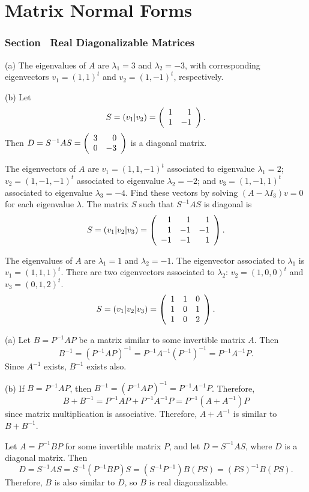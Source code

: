 \chapter{Matrix Normal Forms}

\subsection*{Section~\protect{\ref{S:RDM}} Real Diagonalizable Matrices}

(a) The eigenvalues of $A$ are $\lambda_1 = 3$ and $\lambda_2 = -3$,
with corresponding eigenvectors $v_1 = (1,1)^t$ and $v_2 = (1,-1)^t$,
respectively.

(b) Let
\[
S = (v_1|v_2) = \left(\begin{array}{rr} 1 & 1\\ 1 &-1\end{array}\right).
\]
Then $D = S^{-1}AS = \left(\begin{array}{rr} 3 & 0\\ 0 &-3\end{array}\right)$ is a diagonal matrix.

The eigenvectors of $A$ are $v_1 = (1,1,-1)^t$ associated to eigenvalue
$\lambda_1 = 2$; $v_2 = (1,-1,-1)^t$ associated to eigenvalue
$\lambda_2 = -2$; and $v_3 = (1,-1,1)^t$ associated to eigenvalue
$\lambda_3 = -4$.  Find these vectors by solving $(A - \lambda I_3)v = 0$
for each eigenvalue $\lambda$.  The matrix $S$ such that $S^{-1}AS$ is
diagonal is
\[
S = (v_1|v_2|v_3) = \left(\begin{array}{rrr} 1 & 1 & 1 \\ 1 & -1 & -1 \\ -1 & -1 & 1\end{array}\right).
\]

The eigenvalues of $A$ are $\lambda_1 = 1$ and $\lambda_2 = -1$.  The
eigenvector associated to $\lambda_1$ is $v_1 = (1,1,1)^t$.  There are
two eigenvectors associated to $\lambda_2$: $v_2 = (1,0,0)^t$ and
$v_3 = (0,1,2)^t$.
\[
S = (v_1|v_2|v_3) = \left(\begin{array}{rrr} 1 & 1 & 0 \\ 1 & 0 & 1 \\ 1 & 0 & 2\end{array}\right).
\]

(a) Let $B = P^{-1}AP$ be a matrix similar to some invertible matrix $A$.
Then 
\[
B^{-1} = (P^{-1}AP)^{-1} = P^{-1}A^{-1}(P^{-1})^{-1} = P^{-1}A^{-1}P.
\]
Since $A^{-1}$ exists, $B^{-1}$ exists also.

(b) If $B = P^{-1}AP$, then $B^{-1} = (P^{-1}AP)^{-1} = P^{-1}A^{-1}P$.
Therefore,
\[
B + B^{-1} = P^{-1}AP + P^{-1}A^{-1}P = P^{-1}(A + A^{-1})P
\]
since matrix multiplication is associative.  Therefore, $A + A^{-1}$ is
similar to $B + B^{-1}$.

Let $A = P^{-1}BP$ for some invertible matrix $P$, and let
$D = S^{-1}AS$, where $D$ is a diagonal matrix.  Then
\[
D = S^{-1}AS = S^{-1}(P^{-1}BP)S = (S^{-1}P^{-1})B(PS) = 
(PS)^{-1}B(PS).
\]
Therefore, $B$ is also similar to $D$, so $B$ is real diagonalizable.

